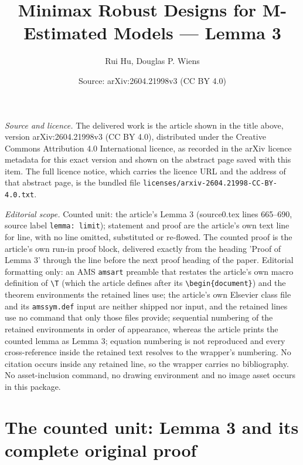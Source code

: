 \documentclass[10pt,a4paper]{amsart}
\title[Minimax Robust Designs for M-Estimated Models]{Minimax Robust Designs for M-Estimated Models — Lemma 3}
\author{Rui Hu, Douglas P. Wiens}
\date{Source: arXiv:2604.21998v3 (CC BY 4.0)}
\theoremstyle{plain}
\theoremstyle{definition}
\theoremstyle{remark}
\begin{document}
\maketitle

\noindent\emph{Source and licence.} The delivered work is the article shown in the title above, version arXiv:2604.21998v3 (CC BY 4.0), distributed under the Creative Commons Attribution 4.0 International licence, as recorded in the arXiv licence metadata for this exact version and shown on the abstract page saved with this item. The full licence notice, which carries the licence URL and the address of that abstract page, is the bundled file \texttt{licenses/arxiv-2604.21998-CC-BY-4.0.txt}.\par\smallskip

\noindent\textit{Editorial scope.} Counted unit: the article's Lemma 3 (source0.tex lines 665--690, source label \texttt{lemma: limit}); statement and proof are the article's own text line for line, with no line omitted, substituted or re-flowed. The counted proof is the article's own run-in proof block, delivered exactly from the heading 'Proof of Lemma 3' through the line before the next proof heading of the paper. Editorial formatting only: an AMS \texttt{amsart} preamble that restates the article's own macro definition of \texttt{\textbackslash T} (which the article defines after its \texttt{\textbackslash begin\{document\}}) and the theorem environments the retained lines use; the article's own Elsevier class file and its \texttt{amssym.def} input are neither shipped nor input, and the retained lines use no command that only those files provide; sequential numbering of the retained environments in order of appearance, whereas the article prints the counted lemma as Lemma 3; equation numbering is not reproduced and every cross-reference inside the retained text resolves to the wrapper's numbering. No citation occurs inside any retained line, so the wrapper carries no bibliography. No asset-inclusion command, no drawing environment and no image asset occurs in this package.


\section{The counted unit: Lemma 3 and its complete original proof}
\end{document}

